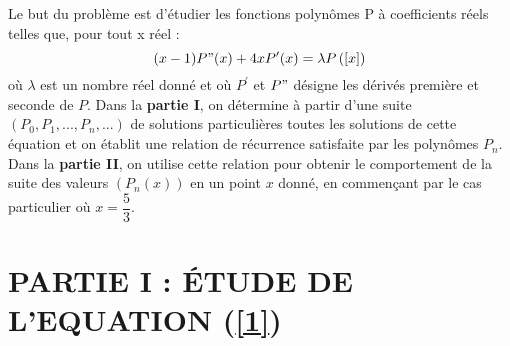 \documentclass[11pt]{article}%
\begin{document}
\noindent Le but du problème est d'étudier les fonctions polynômes P à
coefficients réels telles que, pour tout x réel :\begin{equation}
(x-1)P{"}(x) + 4xP^{\prime }(x) = \lambda P\left(\left[ {x} \right]\right)
\label{1}
\end{equation}où $\lambda $ est un nombre réel donné et où $P^{\prime
}$ et $P{"}$ désigne
les dérivés première et seconde de $P$. Dans la \textbf{partie I}, on
détermine à partir d'une suite $(P_{0},P_{1},...,P_{n},...)$ de
solutions
particulières toutes les solutions de cette équation et on établit une
relation de récurrence satisfaite par les polynômes $P_{n}$. Dans la
\textbf{partie II}, on utilise cette relation pour obtenir le
comportement de la
suite des valeurs $(P_{n}(x))$ en un point $x$ donné, en commençant par
le
cas particulier où $x = \dfrac{5}{3}$.

\section*{PARTIE I : ÉTUDE DE L'EQUATION (\protect\ref{1})}
\end{document}
